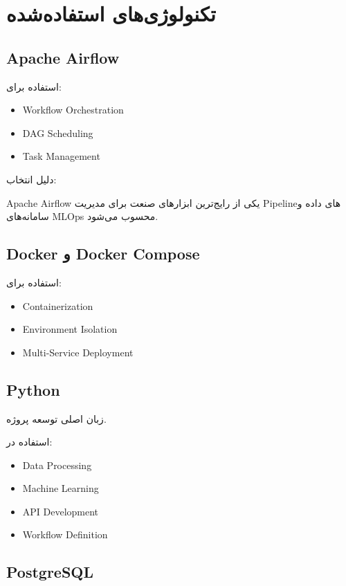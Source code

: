 \documentclass[12pt,a4paper]{article}
\begin{document}

\section{تکنولوژی‌های استفاده‌شده}

\subsection{Apache Airflow}

استفاده برای:

\begin{itemize}
\item Workflow Orchestration
\item DAG Scheduling
\item Task Management
\end{itemize}

دلیل انتخاب:

Apache Airflow یکی از رایج‌ترین ابزارهای صنعت برای مدیریت Pipelineهای داده و سامانه‌های MLOps محسوب می‌شود.

\subsection{Docker و Docker Compose}

استفاده برای:

\begin{itemize}
\item Containerization
\item Environment Isolation
\item Multi-Service Deployment
\end{itemize}

\subsection{Python}

زبان اصلی توسعه پروژه.

استفاده در:

\begin{itemize}
\item Data Processing
\item Machine Learning
\item API Development
\item Workflow Definition
\end{itemize}

\subsection{PostgreSQL}
\end{document}
